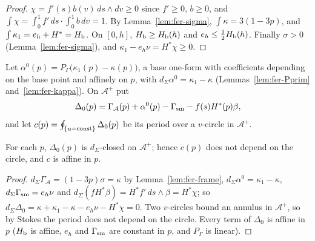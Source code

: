 \begin{proof}
$\chi=f'(s)b(v)\,ds\wedge dv\ge0$ since $f'\ge0$, $b\ge0$, and $\int\chi=\int_0^1f'\,ds\cdot\int_0^1b\,dv=1$. By
Lemma~\ref{lem:fer-sigma}, $\int\kappa=3(1-3p)$, and $\int\kappa_1=e_h+H^*=H_{\mathrm b}$. On $[0,h]$, $H_{\mathrm b}\ge H_{\mathrm b}(h)$ and
$e_h\le\frac12H_{\mathrm b}(h)$. Finally $\sigma>0$ (Lemma~\ref{lem:fer-sigma}), and $\kappa_1-e_h\nu=H^*\chi\ge0$.
\end{proof}

\begin{definition}\label{def:fer-Delta}
Let $\alpha^0(p)=P_\Gamma\big(\kappa_1(p)-\kappa(p)\big)$, a base one-form with coefficients depending on the base point and
affinely on $p$, with $d_\Sigma\alpha^0=\kappa_1-\kappa$ (Lemmas~\ref{lem:fer-Pprim} and~\ref{lem:fer-kappa}). On $\mathcal A^+$ put
\[
 \Delta_0(p)=\Gamma_{\mathcal A}(p)+\alpha^0(p)-\Gamma_{\rm sm}-f(s)H^*(p)\beta ,
\]
and let $c(p)=\oint_{\{u={\rm const}\}}\Delta_0(p)$ be its period over a $v$-circle in $\mathcal A^+$.
\end{definition}

\begin{lemma}\label{lem:fer-Delta}
For each $p$, $\Delta_0(p)$ is $d_\Sigma$-closed on $\mathcal A^+$; hence $c(p)$ does not depend on the circle, and $c$ is affine
in $p$.
\end{lemma}

\begin{proof}
$d_\Sigma\Gamma_{\mathcal A}=(1-3p)\sigma=\kappa$ by Lemma~\ref{lem:fer-frame}, $d_\Sigma\alpha^0=\kappa_1-\kappa$,
$d_\Sigma\Gamma_{\rm sm}=e_h\nu$ and $d_\Sigma(fH^*\beta)=H^*f'\,ds\wedge\beta=H^*\chi$; so
$d_\Sigma\Delta_0=\kappa+\kappa_1-\kappa-e_h\nu-H^*\chi=0$. Two $v$-circles bound an annulus in $\mathcal A^+$, so by Stokes the period
does not depend on the circle. Every term of $\Delta_0$ is affine in $p$ ($H_{\mathrm b}$ is affine, $e_h$ and $\Gamma_{\rm sm}$ are constant in
$p$, and $P_\Gamma$ is linear).
\end{proof}

